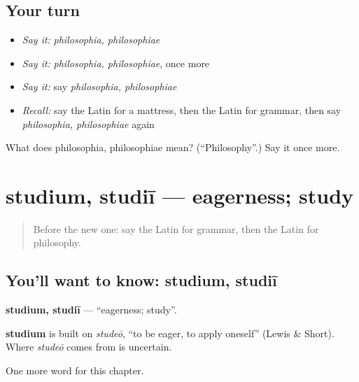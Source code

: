 \subsection*{Your turn}
\begin{itemize}
\raggedright
  \item \emph{Say it:} \emph{philosophia, philosophiae}
  \item \emph{Say it:} \emph{philosophia, philosophiae}, once more
  \item \emph{Say it:} say \emph{philosophia, philosophiae}
  \item \emph{Recall:} say the Latin for a mattress, then the Latin for grammar, then say \emph{philosophia, philosophiae} again
\end{itemize}

\begin{tcolorbox}[breakable,colback=teal!4,colframe=teal!35!black,title={Before you move on}]
What does philosophia, philosophiae mean? (\textquotedblleft{}Philosophy\textquotedblright{}.) Say it once more.
\end{tcolorbox}
\section[studium, studiī]{studium, studiī — eagerness; study}

\label{lesson:LA-C226-studium}



\begin{quote}
Before the new one: say the Latin for grammar, then the Latin for philosophy.
\end{quote}

\subsection*{You'll want to know: studium, studiī}
\textbf{studium, studiī} — \textquotedblleft{}eagerness; study\textquotedblright{}.

\begin{cousinweb}
\textbf{studium} is built on \emph{studeō}, \textquotedblleft{}to be eager, to apply oneself\textquotedblright{} (Lewis \& Short). Where \emph{studeō} comes from is uncertain.
\end{cousinweb}

\begin{grammarlens}[title={What you've built}]
One more word for this chapter.
\end{grammarlens}

